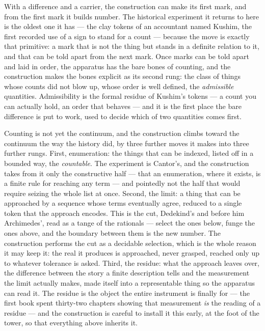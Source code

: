 With a difference and a carrier, the construction can make its first mark, and from the first mark it
builds number. The historical experiment it returns to here is the oldest one it has --- the clay tokens
of an accountant named Kushim, the first recorded use of a sign to stand for a count --- because the move
is exactly that primitive: a mark that is not the thing but stands in a definite relation to it, and that
can be told apart from the next mark. Once marks can be told apart and laid in order, the apparatus has the
bare bones of counting, and the construction makes the bones explicit as its second rung: the class of
things whose counts did not blow up, whose order is well defined, the \emph{admissible} quantities.
Admissibility is the formal residue of Kushim's tokens --- a count you can actually hold, an order that
behaves --- and it is the first place the bare difference is put to work, used to decide which of two
quantities comes first.

Counting is not yet the continuum, and the construction climbs toward the continuum the way the history
did, by three further moves it makes into three further rungs. First, enumeration: the things that can be
indexed, listed off in a bounded way, the \emph{countable}. The experiment is Cantor's, and the
construction takes from it only the constructive half --- that an enumeration, where it exists, is a finite
rule for reaching any term --- and pointedly not the half that would require seizing the whole list at
once. Second, the limit: a thing that can be approached by a sequence whose terms eventually agree,
reduced to a single token that the approach encodes. This is the cut, Dedekind's and before him
Archimedes', read as a tange of the rationals --- select the ones below, funge the ones above, and the
boundary between them is the new number. The construction performs the cut as a decidable selection, which
is the whole reason it may keep it: the real it produces is approached, never grasped, reached only up to
whatever tolerance is asked. Third, the residue: what the approach leaves over, the difference between the
story a finite description tells and the measurement the limit actually makes, made itself into a
representable thing so the apparatus can read it. The residue is the object the entire instrument is
finally for --- the first book spent thirty-two chapters showing that measurement \emph{is} the reading of
a residue --- and the construction is careful to install it this early, at the foot of the tower, so that
everything above inherits it.

